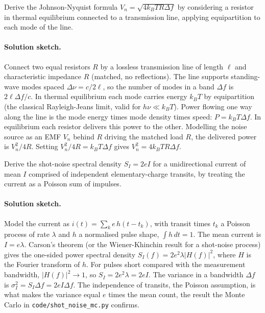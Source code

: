 \begin{exercise}
Derive the Johnson-Nyquist formula $V_{n} = \sqrt{4k_{B}TR\Delta f}$
by considering a resistor in thermal equilibrium connected to a
transmission line, applying equipartition to each mode of the line.
\paragraph{Solution sketch.} Connect two equal resistors $R$ by a
lossless transmission line of length $\ell$ and characteristic
impedance $R$ (matched, no reflections). The line supports standing-wave
modes spaced $\Delta\nu = c/2\ell$, so the number of modes in a band
$\Delta f$ is $2\ell\Delta f/c$. In thermal equilibrium each mode
carries energy $k_{B}T$ by equipartition (the classical Rayleigh-Jeans
limit, valid for $h\nu \ll k_{B}T$). Power flowing one way along the
line is the mode energy times mode density times speed: $P = k_{B}T
\Delta f$. In equilibrium each resistor delivers this power to the
other. Modelling the noise source as an EMF $V_{n}$ behind $R$ driving
the matched load $R$, the delivered power is $V_{n}^{2}/4R$. Setting
$V_{n}^{2}/4R = k_{B}T\Delta f$ gives $V_{n}^{2} = 4k_{B}TR\Delta f$.
\end{exercise}

\begin{exercise}
Derive the shot-noise spectral density $S_{I} = 2eI$ for a
unidirectional current of mean $I$ comprised of independent
elementary-charge transits, by treating the current as a Poisson
sum of impulses.
\paragraph{Solution sketch.} Model the current as $i(t) = \sum_{k}
e\,h(t - t_{k})$, with transit times $t_{k}$ a Poisson process of rate
$\lambda$ and $h$ a normalised pulse shape, $\int h\,dt = 1$. The mean
current is $I = e\lambda$. Carson's theorem (or the Wiener-Khinchin
result for a shot-noise process) gives the one-sided power spectral
density $S_{I}(f) = 2e^{2}\lambda|H(f)|^{2}$, where $H$ is the Fourier
transform of $h$. For pulses short compared with the measurement
bandwidth, $|H(f)|^{2} \to 1$, so $S_{I} = 2e^{2}\lambda = 2eI$. The
variance in a bandwidth $\Delta f$ is $\sigma_{I}^{2} = S_{I}\Delta f =
2eI\Delta f$. The independence of transits, the Poisson assumption, is
what makes the variance equal $e$ times the mean count, the result the
Monte Carlo in \texttt{code/shot\_noise\_mc.py} confirms.
\end{exercise}

